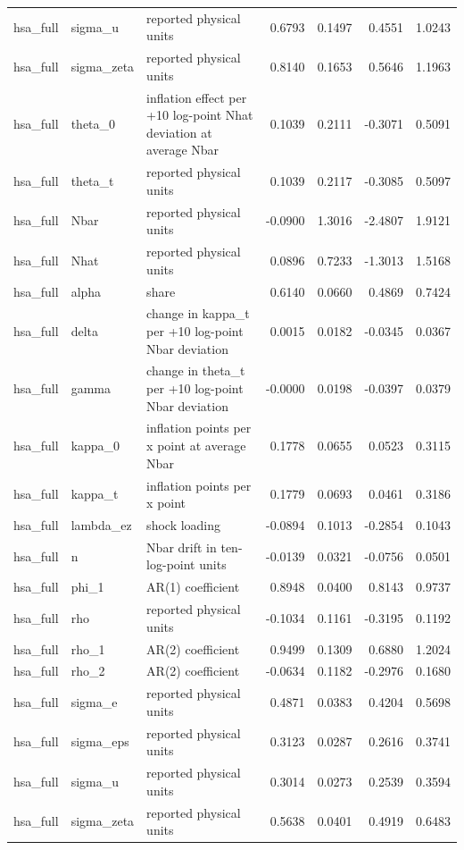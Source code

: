 \begin{tabular}{lllrrrr}
hsa\_full & sigma\_u & reported physical units & 0.6793 & 0.1497 & 0.4551 & 1.0243 \\
hsa\_full & sigma\_zeta & reported physical units & 0.8140 & 0.1653 & 0.5646 & 1.1963 \\
hsa\_full & theta\_0 & inflation effect per +10 log-point Nhat deviation at average Nbar & 0.1039 & 0.2111 & -0.3071 & 0.5091 \\
hsa\_full & theta\_t & reported physical units & 0.1039 & 0.2117 & -0.3085 & 0.5097 \\
hsa\_full & Nbar & reported physical units & -0.0900 & 1.3016 & -2.4807 & 1.9121 \\
hsa\_full & Nhat & reported physical units & 0.0896 & 0.7233 & -1.3013 & 1.5168 \\
hsa\_full & alpha & share & 0.6140 & 0.0660 & 0.4869 & 0.7424 \\
hsa\_full & delta & change in kappa\_t per +10 log-point Nbar deviation & 0.0015 & 0.0182 & -0.0345 & 0.0367 \\
hsa\_full & gamma & change in theta\_t per +10 log-point Nbar deviation & -0.0000 & 0.0198 & -0.0397 & 0.0379 \\
hsa\_full & kappa\_0 & inflation points per x point at average Nbar & 0.1778 & 0.0655 & 0.0523 & 0.3115 \\
hsa\_full & kappa\_t & inflation points per x point & 0.1779 & 0.0693 & 0.0461 & 0.3186 \\
hsa\_full & lambda\_ez & shock loading & -0.0894 & 0.1013 & -0.2854 & 0.1043 \\
hsa\_full & n & Nbar drift in ten-log-point units & -0.0139 & 0.0321 & -0.0756 & 0.0501 \\
hsa\_full & phi\_1 & AR(1) coefficient & 0.8948 & 0.0400 & 0.8143 & 0.9737 \\
hsa\_full & rho & reported physical units & -0.1034 & 0.1161 & -0.3195 & 0.1192 \\
hsa\_full & rho\_1 & AR(2) coefficient & 0.9499 & 0.1309 & 0.6880 & 1.2024 \\
hsa\_full & rho\_2 & AR(2) coefficient & -0.0634 & 0.1182 & -0.2976 & 0.1680 \\
hsa\_full & sigma\_e & reported physical units & 0.4871 & 0.0383 & 0.4204 & 0.5698 \\
hsa\_full & sigma\_eps & reported physical units & 0.3123 & 0.0287 & 0.2616 & 0.3741 \\
hsa\_full & sigma\_u & reported physical units & 0.3014 & 0.0273 & 0.2539 & 0.3594 \\
hsa\_full & sigma\_zeta & reported physical units & 0.5638 & 0.0401 & 0.4919 & 0.6483 \\

\end{tabular}

